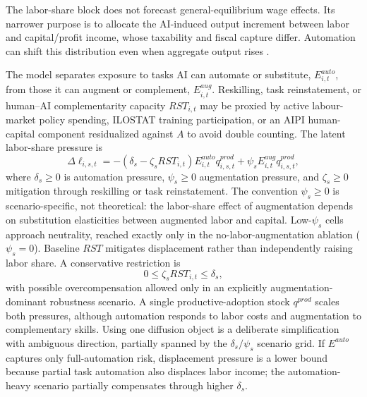\documentclass[11pt,a4paper]{article}
\begin{document}
The labor-share block does not forecast general-equilibrium wage effects. Its narrower purpose is to allocate the AI-induced output increment between labor and capital/profit income, whose taxability and fiscal capture differ. Automation can shift this distribution even when aggregate output rises \citep{acemoglu2018race,acemoglu2019automation,karabarbounis2014global}.

The model separates exposure to tasks AI can automate or substitute, $E^{auto}_{i,t}$, from those it can augment or complement, $E^{aug}_{i,t}$. Reskilling, task reinstatement, or human--AI complementarity capacity $RST_{i,t}$ may be proxied by active labour-market policy spending, ILOSTAT training participation, or an AIPI human-capital component residualized against $A$ to avoid double counting. The latent labor-share pressure is
\begin{equation}
    \Delta \ell_{i,s,t}
    =
    -\left(\delta_s-\zeta_s RST_{i,t}\right)
    E^{auto}_{i,t}q^{prod}_{i,s,t}
    +
    \psi_s E^{aug}_{i,t}q^{prod}_{i,s,t},
\end{equation}
where $\delta_s\geq0$ is automation pressure, $\psi_s\geq0$ augmentation pressure, and $\zeta_s\geq0$ mitigation through reskilling or task reinstatement. The convention $\psi_s\geq0$ is scenario-specific, not theoretical: the labor-share effect of augmentation depends on substitution elasticities between augmented labor and capital. Low-$\psi_s$ cells approach neutrality, reached exactly only in the no-labor-augmentation ablation ($\psi_s=0$). Baseline $RST$ mitigates displacement rather than independently raising labor share. A conservative restriction is
\begin{equation}
    0\leq \zeta_s RST_{i,t}\leq \delta_s,
\end{equation}
with possible overcompensation allowed only in an explicitly augmentation-dominant robustness scenario.
A single productive-adoption stock $q^{prod}$ scales both pressures, although automation responds to labor costs and augmentation to complementary skills. Using one diffusion object is a deliberate simplification with ambiguous direction, partially spanned by the $\delta_s/\psi_s$ scenario grid. If $E^{auto}$ captures only full-automation risk, displacement pressure is a lower bound because partial task automation also displaces labor income; the automation-heavy scenario partially compensates through higher $\delta_s$.
\end{document}
